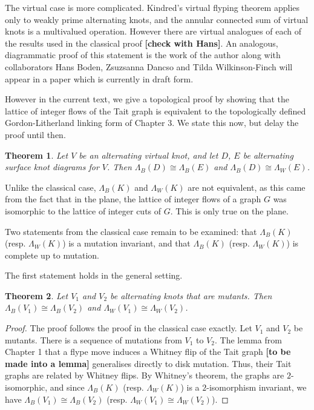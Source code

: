 \documentclass[12pt]{report}
\newcommand{\notered}[1]{{\color{Red} \textbf{#1}}}
\newtheorem*{theorem}{Theorem}
\begin{document}
The virtual case is more complicated. Kindred's virtual flyping theorem applies only to weakly prime alternating knots, and the annular connected sum of virtual knots is a multivalued operation. However there are virtual analogues of each of the results used in the classical proof \notered{[check with Hans]}. An analogous, diagrammatic proof of this statement is the work of the author along with collaborators Hans Boden, Zsuzsanna Dancso and Tilda Wilkinson-Finch will appear in a paper which is currently in draft form.

However in the current text, we give a topological proof by showing that the lattice of integer flows of the Tait graph is equivalent to the topologically defined Gordon-Litherland linking form of Chapter 3. We state this now, but delay the proof until then.

\begin{theorem}
Let $V$ be an alternating virtual knot, and let $D$, $E$ be alternating surface knot diagrams for $V$. Then $\Lambda_{B}(D) \cong \Lambda_{B}(E)$ and $\Lambda_{B}(D) \cong \Lambda_{W}(E)$.
\end{theorem}

Unlike the classical case, $\Lambda_{B}(K)$ and $\Lambda_{W}(K)$ are not equivalent, as this came from the fact that in the plane, the lattice of integer flows of a graph $G$ was isomorphic to the lattice of integer cuts of $G$. This is only true on the plane.

Two statements from the classical case remain to be examined: that $\Lambda_{B}(K)$ (resp. $\Lambda_{W}(K)$) is a mutation invariant, and that $\Lambda_{B}(K)$ (resp. $\Lambda_{W}(K)$) is complete up to mutation.

The first statement holds in the general setting.
\begin{theorem}
Let $V_{1}$ and $V_{2}$ be alternating knots that are mutants. Then $\Lambda_{B}(V_{1}) \cong \Lambda_{B}(V_{2})$ and $\Lambda_{W}(V_{1}) \cong \Lambda_{W}(V_{2})$.
\end{theorem}
\begin{proof}
The proof follows the proof in the classical case exactly. Let $V_{1}$ and $V_{2}$ be mutants. There is a sequence of mutations from $V_{1}$ to $V_{2}$. The lemma from Chapter 1 that a flype move induces a Whitney flip of the Tait graph \notered{[to be made into a lemma]} generalises directly to disk mutation. Thus, their Tait graphs are related by Whitney flips. By Whitney's theorem, the graphs are $2$-isomorphic, and since $\Lambda_{B}(K)$ (resp. $\Lambda_{W}(K)$) is a $2$-isomorphism invariant, we have $\Lambda_{B}(V_{1}) \cong \Lambda_{B}(V_{2})$ (resp. $\Lambda_{W}(V_{1}) \cong \Lambda_{W}(V_{2})$).
\end{proof}
\end{document}
